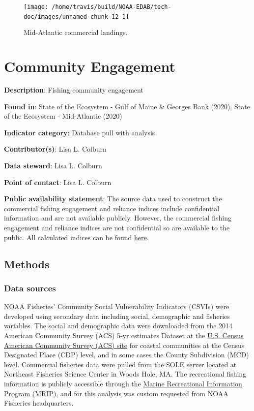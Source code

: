 \documentclass[
]{book}
\begin{document}
\begin{figure}

{\centering \texttt{[image: /home/travis/build/NOAA-EDAB/tech-doc/images/unnamed-chunk-12-1]} 

}

\caption{Mid-Atlantic commercial landings.}\label{fig:unnamed-chunk-12}
\end{figure}

\hypertarget{community-engagement}{%
\chapter{Community Engagement}\label{community-engagement}}

\textbf{Description}: Fishing community engagement

\textbf{Found in}: State of the Ecosystem - Gulf of Maine \& Georges Bank (2020), State of the Ecosystem - Mid-Atlantic (2020)

\textbf{Indicator category}: Database pull with analysis

\textbf{Contributor(s)}: Lisa L. Colburn

\textbf{Data steward}: Lisa L. Colburn

\textbf{Point of contact}: Lisa L. Colburn

\textbf{Public availability statement}: The source data used to construct the commercial fishing engagement and reliance indices include confidential information and are not available publicly. However, the commercial fishing engagement and reliance indices are not confidential so are available to the public. All calculated indices can be found \href{https://www.fisheries.noaa.gov/national/socioeconomics/social-indicators-fishing-communities-0}{here}.

\hypertarget{methods-11}{%
\section{Methods}\label{methods-11}}

\hypertarget{data-sources-11}{%
\subsection{Data sources}\label{data-sources-11}}

NOAA Fisheries' Community Social Vulnerability Indicators (CSVIs) were developed using secondary data including social, demographic and fisheries variables. The social and demographic data were downloaded from the 2014 American Community Survey (ACS) 5-yr estimates Dataset at the \href{https://www.census.gov/programs-surveys/acs/}{U.S. Census American Community Survey (ACS) site} for coastal communities at the Census Designated Place (CDP) level, and in some cases the County Subdivision (MCD) level. Commercial fisheries data were pulled from the SOLE server located at Northeast Fisheries Science Center in Woods Hole, MA. The recreational fishing information is publicly accessible through the \href{https://www.st.nmfs.noaa.gov/recreational-fisheries/MRIP/}{Marine Recreational Information Program (MRIP)}, and for this analysis was custom requested from NOAA Fisheries headquarters.
\end{document}
